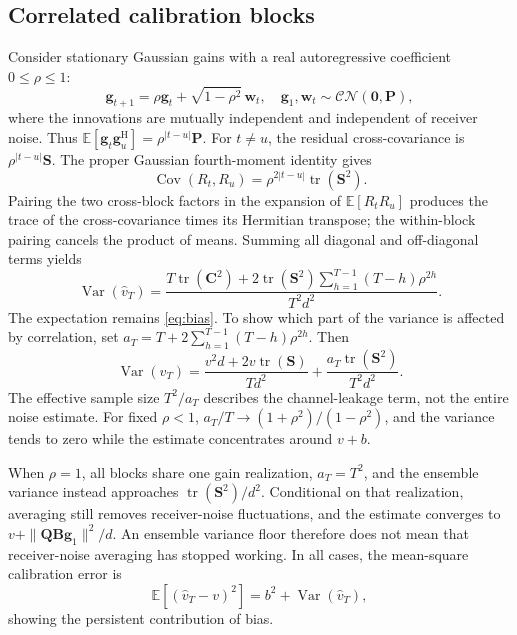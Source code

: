 \subsection{Correlated calibration blocks}
Consider stationary Gaussian gains with a real autoregressive coefficient
$0\leq\rho\leq1$:
\begin{equation}
 \mathbf g_{t+1}=\rho\mathbf g_t+\sqrt{1-\rho^2}\,\mathbf w_t,
 \quad \mathbf g_1,\mathbf w_t\sim\mathcal{CN}(\mathbf0,\mathbf P),
 \label{eq:ar1}
\end{equation}
where the innovations are mutually independent and independent of receiver
noise. Thus
$\mathbb E[\mathbf g_t\mathbf g_u^{\mathrm H}]=\rho^{|t-u|}\mathbf P$.
For $t\ne u$, the residual cross-covariance is
$\rho^{|t-u|}\mathbf S$. The proper Gaussian fourth-moment identity gives
\begin{equation}
 \operatorname{Cov}(R_t,R_u)
   =\rho^{2|t-u|}\operatorname{tr}(\mathbf S^2).
 \label{eq:crosscovariance}
\end{equation}
Pairing the two cross-block factors in the expansion of
$\mathbb E[R_tR_u]$ produces the trace of the cross-covariance times its
Hermitian transpose; the within-block pairing cancels the product of means.
Summing all diagonal and off-diagonal terms yields
\begin{equation}
 \operatorname{Var}(\widehat v_T)=
 \frac{T\operatorname{tr}(\mathbf C^2)
 +2\operatorname{tr}(\mathbf S^2)
   \sum_{h=1}^{T-1}(T-h)\rho^{2h}}{T^2d^2}.
 \label{eq:correlatedvariance}
\end{equation}
The expectation remains \eqref{eq:bias}. To show which part of the variance
is affected by correlation, set
$a_T=T+2\sum_{h=1}^{T-1}(T-h)\rho^{2h}$. Then
\begin{equation}
 \operatorname{Var}(\widehat v_T)=
 \frac{v^2d+2v\operatorname{tr}(\mathbf S)}{Td^2}
 +\frac{a_T\operatorname{tr}(\mathbf S^2)}{T^2d^2}.
 \label{eq:varianceparts}
\end{equation}
The effective sample size $T^2/a_T$ describes the channel-leakage term,
not the entire noise estimate. For fixed $\rho<1$,
$a_T/T\to(1+\rho^2)/(1-\rho^2)$, and the variance tends to zero while the
estimate concentrates around $v+b$.

When $\rho=1$, all blocks share one gain realization, $a_T=T^2$, and the
ensemble variance instead approaches
$\operatorname{tr}(\mathbf S^2)/d^2$. Conditional on that realization,
averaging still removes receiver-noise fluctuations, and the estimate converges
to $v+\|\mathbf Q\mathbf B\mathbf g_1\|^2/d$. An ensemble variance floor
therefore does not mean that receiver-noise averaging has stopped working.
In all cases, the mean-square calibration error is
\begin{equation}
 \mathbb E[(\widehat v_T-v)^2]
   =b^2+\operatorname{Var}(\widehat v_T),
 \label{eq:calibrationmse}
\end{equation}
showing the persistent contribution of bias.

